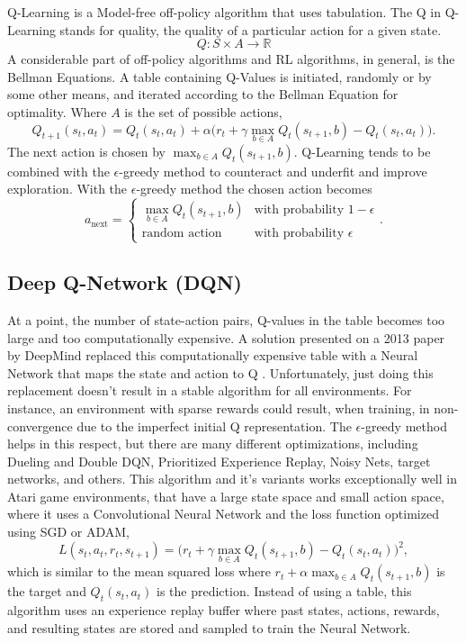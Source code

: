 Q-Learning is a Model-free off-policy algorithm that uses tabulation. The Q in Q-Learning stands for quality, the quality of a particular action for a given state. $$Q:S\times A\rightarrow \mathbb{R}$$ A considerable part of off-policy algorithms and RL algorithms, in general, is the Bellman Equations. A table containing Q-Values is initiated, randomly or by some other means, and iterated according to the Bellman Equation for optimality. Where $A$ is the set of possible actions, 
\begin{equation}\label{eq:qupdate}
	Q_{t+1}(s_t, a_t)=Q_t(s_t, a_t)+\alpha \big(r_t+\gamma\max_{b\in A} Q_t(s_{t+1},b)-Q_t(s_t,a_t)\big).
\end{equation}
 The next action is chosen by $\max_{b\in A} Q_t(s_{t+1},b)$. Q-Learning tends to be combined with the $\epsilon$-greedy method to counteract and underfit and improve exploration. With the $\epsilon$-greedy method the chosen action becomes $$a_{\text{next}}=\begin{cases}\max_{b\in A} Q_t(s_{t+1},b) & \text{with probability }1-\epsilon \\ \text{random action}  & \text{with probability }\epsilon\end{cases}.$$

\subsection{Deep Q-Network (DQN)}

At a point, the number of state-action pairs, Q-values in the table becomes too large and too computationally expensive. A solution presented on a 2013 paper by DeepMind replaced this computationally expensive table with a Neural Network that maps the state and action to Q \cite{mnih_kavukcuoglu_silver_graves_antonoglou_wierstra_riedmiller_2013}. Unfortunately, just doing this replacement doesn't result in a stable algorithm for all environments. For instance, an environment with sparse rewards could result, when training, in non-convergence due to the imperfect initial Q representation. The $\epsilon$-greedy method helps in this respect, but there are many different optimizations, including Dueling and Double DQN, Prioritized Experience Replay, Noisy Nets, target networks, and others. This algorithm and it's variants works exceptionally well in Atari game environments, that have a large state space and small action space, where it uses a Convolutional Neural Network and the loss function optimized using SGD or ADAM, 
\begin{equation}\label{eq:dqnloss}
	L(s_t, a_t, r_t, s_{t+1})=\big(r_t+\gamma\max_{b\in A} Q_t(s_{t+1},b)-Q_t(s_t,a_t)\big)^2,
\end{equation} 
which is similar to the mean squared loss where $r_t+\alpha\max_{b\in A} Q_t(s_{t+1},b)$ is the target and $Q_t(s_t,a_t)$ is the prediction. Instead of using a table, this algorithm uses an experience replay buffer where past states, actions, rewards, and resulting states are stored and sampled to train the Neural Network.

